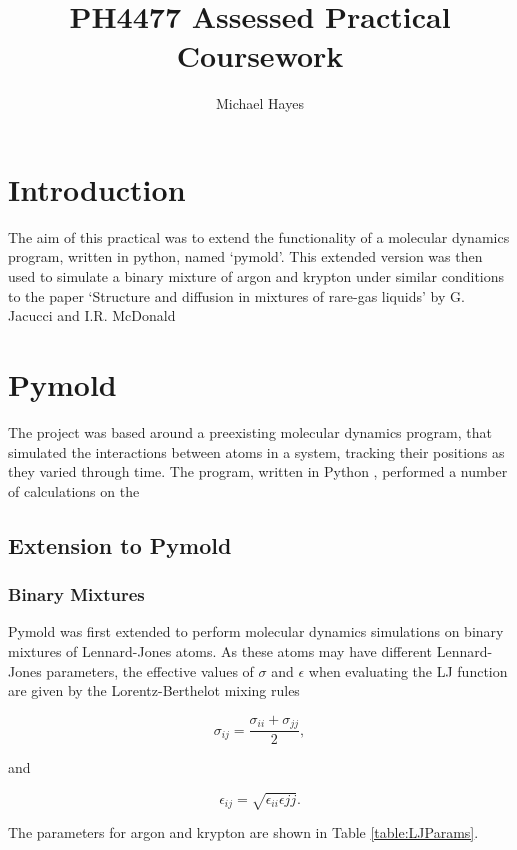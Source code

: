 \documentclass{article}
\title{PH4477 Assessed Practical Coursework}
\author{Michael Hayes}
\begin{document}
\maketitle
\large
\onehalfspacing

\section{Introduction}

The aim of this practical was to extend the functionality of a molecular dynamics program, written in python, named `pymold'. This extended version was then used to simulate a binary mixture of argon and krypton under similar conditions to the paper `Structure and diffusion in mixtures of rare-gas liquids' by G. Jacucci and I.R. McDonald 

\section{Pymold}
The project was based around a preexisting molecular dynamics program, that simulated the interactions between atoms in a system, tracking their positions as they varied through time. The program, written in Python \cite{TODO}, performed a number of calculations on the


\subsection{Extension to Pymold}


\subsubsection{Binary Mixtures}
Pymold was first extended to perform molecular dynamics simulations on binary mixtures of Lennard-Jones atoms. As these atoms may have different Lennard-Jones parameters, the effective values of $\sigma$ and $\epsilon$ when evaluating the LJ function are given by the Lorentz-Berthelot mixing rules

\begin{equation}
\sigma_{ij} = \frac{\sigma_{ii} + \sigma_{jj}}{2},
\end{equation}

and

\begin{equation}
\epsilon_{ij} = \sqrt{\epsilon_{ii}\epsilon{jj}}.
\end{equation}

The parameters for argon and krypton are shown in Table \ref{table:LJParams}.
\end{document}
